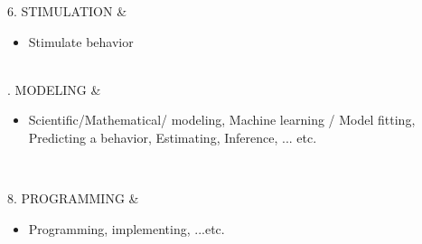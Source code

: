 \begin{table}
\begin{tabularx}{\textwidth}
		6. STIMULATION    &
		\begin{itemize}
			\itemsep0em
			\item Stimulate behavior 
		\end{itemize} \\
		. MODELING    &
		\begin{itemize}
			\itemsep0em
			\item Scientific/Mathematical/ modeling,  Machine learning / Model fitting, Predicting a behavior, Estimating, Inference, ... etc. 
		\end{itemize} \\
		\hline
		
			8. PROGRAMMING    &
		\begin{itemize}
			\itemsep0em
			\item Programming, implementing, ...etc. 
		\end{itemize} \\
		\hline

	\end{tabularx}
\end{table}







